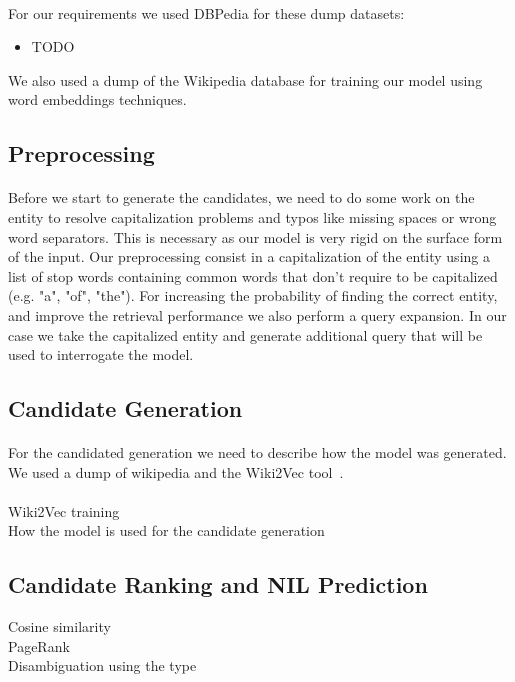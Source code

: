 \paragraph{}
For our requirements we used DBPedia for these dump datasets:
\begin{itemize}
\item TODO
\end{itemize} 
We also used a dump of the Wikipedia database for training our model using word embeddings techniques.


\subsection{Preprocessing}
\paragraph{} 
Before we start to generate the candidates, we need to do some work on the entity to resolve capitalization problems and typos like missing spaces or wrong word separators. This is necessary as our model is very rigid on  the surface form of the input. Our preprocessing consist in a capitalization of the entity using a list of stop words containing common words that don't require to be capitalized (e.g. "a", "of", "the"). For increasing the probability of finding the correct entity, and improve the retrieval performance we also perform a query expansion. In our case we take the capitalized entity and generate additional query that will be used to interrogate the model.

\subsection{Candidate Generation}
\paragraph{}
For the candidated generation we need to describe how the model was generated. We used a dump of wikipedia and the Wiki2Vec tool~\cite{wiki2vec}.
\paragraph{}
Wiki2Vec training \\
How the model is used for the candidate generation

\subsection{Candidate Ranking and NIL Prediction}
Cosine similarity\\
PageRank\\
Disambiguation using the type
